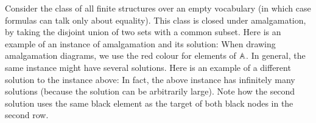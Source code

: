 \begin{myexample}
	\label{example:pure-set-fraisse}
	Consider the class of all finite structures over an empty vocabulary (in which case formulas can talk only about equality). This class is closed under amalgamation, by taking the disjoint union of two sets with a common subset. Here is an example of an instance of amalgamation and its solution:
	When drawing amalgamation diagrams, we use the red colour for elements of $\mathbb A$. 
	In general, the same instance might have several solutions. Here is an example of a different solution to the instance above:
	 In fact, the above instance has infinitely many solutions (because the solution can be arbitrarily large).
	Note how the second solution uses the same black element as the target of both black nodes in the second row.
\end{myexample}



